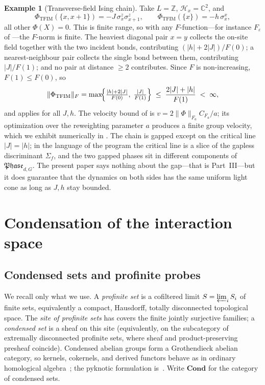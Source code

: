 \documentclass[12pt]{article}
\newcommand{\Ffun}{F}                          %
\newcommand{\Phase}{\mathfrak{Phase}}          %
\newcommand{\Sig}{\Sigma}                       %
\newcommand{\Fnorm}[1]{\lVert #1\rVert_{F}}
\newcommand{\Fanorm}[1]{\lVert #1\rVert_{F_a}}
\newcommand{\C}{\mathbb{C}}
\newcommand{\Z}{\mathbb{Z}}
\newcommand{\Set}{\mathbf{Cond}}
\theoremstyle{definition}
\newtheorem{example}[theorem]{Example}
\theoremstyle{remark}
\begin{document}
\begin{example}[Transverse-field Ising chain]
\label{ex:tfim}
Take $L=\Z$, $\mathcal H_x=\C^2$, and
\[
  \Phi_{\mathrm{TFIM}}(\{x,x+1\})=-J\,\sigma^z_x\sigma^z_{x+1},\qquad
  \Phi_{\mathrm{TFIM}}(\{x\})=-h\,\sigma^x_x,
\]
all other $\Phi(X)=0$. This is finite range, so with any $\Ffun$-function---for instance
$\Ffun_\varepsilon$ of ---the $\Ffun$-norm is finite. The heaviest diagonal
pair $x=y$ collects the on-site field together with the two incident bonds, contributing
$(\lvert h\rvert+2\lvert J\rvert)/\Ffun(0)$; a nearest-neighbour pair collects the single bond
between them, contributing $\lvert J\rvert/\Ffun(1)$; and no pair at distance $\ge 2$
contributes. Since $\Ffun$ is non-increasing, $\Ffun(1)\le\Ffun(0)$, so
\[
  \Fnorm{\Phi_{\mathrm{TFIM}}}
  =\max\!\Bigl\{\tfrac{\lvert h\rvert+2\lvert J\rvert}{\Ffun(0)},\;
     \tfrac{\lvert J\rvert}{\Ffun(1)}\Bigr\}
  \;\le\;\frac{2\lvert J\rvert+\lvert h\rvert}{\Ffun(1)}\;<\;\infty,
\]
and  applies for all $J,h$. The velocity bound of  is
$v=2\Fanorm{\Phi}C_{\Ffun_a}/a$; its optimization over the reweighting parameter $a$ produces
a finite group velocity, which we exhibit numerically in . The chain is
gapped except on the critical line $\lvert J\rvert=\lvert h\rvert$; in the language of the
program the critical line is a slice of the gapless discriminant $\Sig_f$, and the two gapped
phases sit in different components of $\Phase_{d,G}$. The present paper says nothing about the
gap---that is Part~III---but it does guarantee that the dynamics on both sides has the same
uniform light cone as long as $J,h$ stay bounded.
\end{example}

\section{Condensation of the interaction space}
\label{sec:condensation}

\subsection{Condensed sets and profinite probes}
\label{sec:condensation-recall}

We recall only what we use. A \emph{profinite set} is a cofiltered limit $S=\varprojlim_i
S_i$ of finite sets, equivalently a compact, Hausdorff, totally disconnected topological
space. The \emph{site of profinite sets} has covers the finite jointly surjective families;
a \emph{condensed set} is a sheaf on this site (equivalently, on the subcategory of
extremally disconnected profinite sets, where sheaf and product-preserving presheaf coincide).
Condensed abelian groups form a Grothendieck abelian category, so kernels, cokernels, and
derived functors behave as in ordinary homological algebra~\cite{clausen-scholze-condensed};
the pyknotic formulation is~\cite{barwick-haine-pyknotic}. Write $\Set$ for the category of
condensed sets.
\end{document}
